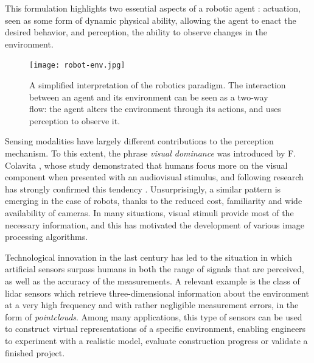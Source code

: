 This formulation highlights two essential aspects of a robotic agent : actuation, seen as some form of dynamic physical ability, allowing the agent to enact the desired behavior, and perception, the ability to observe changes in the environment.


\begin{figure}[H]
    \centering
    \texttt{[image: robot-env.jpg]}
    \caption[Perception in the Robot-Environment exchange]{A simplified interpretation of the robotics paradigm. The interaction between an agent and its environment can be seen as a two-way flow: the agent alters the environment through its actions, and uses perception to observe it.}
    \label{fig:robot-env}
\end{figure}


Sensing modalities have largely different contributions to the perception mechanism. To this extent, the phrase \emph{visual dominance} was introduced by F. Colavita \cite{colavita1974human}, whose study demonstrated that humans focus more on the visual component when presented with an audiovisual stimulus, and following research has strongly confirmed this tendency \cite{Hutmacher2019} \cite{hecht2009sensory}. Unsurprisingly, a similar pattern is emerging in the case of robots, thanks to the reduced cost, familiarity and wide availability of cameras. In many situations, visual stimuli provide most of the necessary information, and this has motivated the development of various image processing algorithms.

Technological innovation in the last century has led to the situation in which artificial sensors surpass humans in both the range of signals that are perceived, as well as the accuracy of the measurements. A relevant example is the class of \acrfull{lidar} sensors which retrieve three-dimensional information about the environment at a very high frequency and with rather negligible measurement errors, in the form of \emph{\glspl{pointcloud}}. Among many applications, this type of sensors can be used to construct virtual representations of a specific environment, enabling engineers to experiment with a realistic model, evaluate construction progress or validate a finished project.

